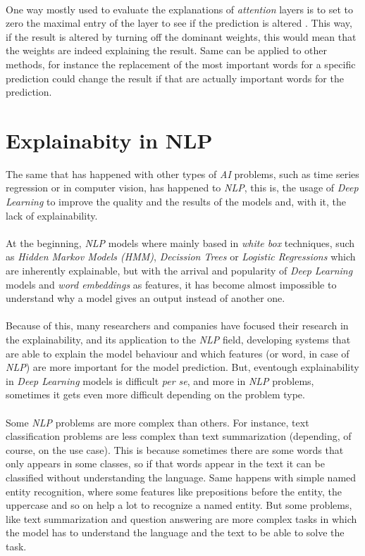 \paragraph{}
One way mostly used to evaluate the explanations of \emph{attention} layers is to set to zero the maximal entry of the layer to see if the prediction is altered \cite{Serrano2019}. This way, if the result is altered by turning off the dominant weights, this would mean that the weights are indeed explaining the result. Same can be applied to other methods, for instance the replacement of the most important words for a specific prediction could change the result if that are actually important words for the prediction.
\section{Explainabity in NLP}
\label{sec:ExplainabilityNLP}
\noindent The same that has happened with other types of \emph{AI} problems, such as time series regression or in computer vision, has happened to \emph{NLP}, this is, the usage of \emph{Deep Learning} to improve the quality and the results of the models and, with it, the lack of explainability.
\paragraph{}
At the beginning, \emph{NLP} models where mainly based in \emph{white box} techniques, such as \emph{Hidden Markov Models (HMM)}, \emph{Decission Trees} or \emph{Logistic Regressions} which are inherently explainable, but with the arrival and popularity of \emph{Deep Learning} models and \emph{word embeddings} as features, it has become almost impossible to understand why a model gives an output instead of another one. 
\paragraph{}
Because of this, many researchers and companies have focused their research in the explainability, and its application to the \emph{NLP} field, developing systems that are able to explain the model behaviour and which features (or word, in case of \emph{NLP}) are more important for the model prediction. But, eventough explainability in \emph{Deep Learning} models is difficult \emph{per se}, and more in \emph{NLP} problems, sometimes it gets even more difficult depending on the problem type.
\paragraph{}
Some \emph{NLP} problems are more complex than others. For instance, text classification problems are less complex than text summarization (depending, of course, on the use case). This is because sometimes there are some words that only appears in some classes, so if that words appear in the text it can be classified without understanding the language. Same happens with simple named entity recognition, where some features like prepositions before the entity, the uppercase and so on help a lot to recognize a named entity. But some problems, like text summarization and question answering are more complex tasks in which the model has to understand the language and the text to be able to solve the task.
